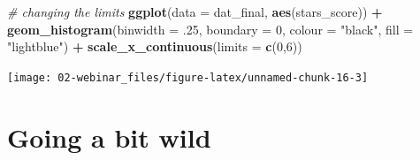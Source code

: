 \documentclass[
  oneside]{book}
\newenvironment{Shaded}{\begin{snugshade}}{\end{snugshade}}
\newcommand{\AttributeTok}[1]{\textcolor[rgb]{0.13,0.29,0.53}{#1}}
\newcommand{\CommentTok}[1]{\textcolor[rgb]{0.56,0.35,0.01}{\textit{#1}}}
\newcommand{\DecValTok}[1]{\textcolor[rgb]{0.00,0.00,0.81}{#1}}
\newcommand{\FunctionTok}[1]{\textcolor[rgb]{0.13,0.29,0.53}{\textbf{#1}}}
\newcommand{\NormalTok}[1]{#1}
\newcommand{\SpecialCharTok}[1]{\textcolor[rgb]{0.81,0.36,0.00}{\textbf{#1}}}
\newcommand{\StringTok}[1]{\textcolor[rgb]{0.31,0.60,0.02}{#1}}
\begin{document}
\begin{Shaded}
\begin{Highlighting}[]
\CommentTok{\# changing the limits}
\FunctionTok{ggplot}\NormalTok{(}\AttributeTok{data =}\NormalTok{ dat\_final, }\FunctionTok{aes}\NormalTok{(stars\_score)) }\SpecialCharTok{+}
  \FunctionTok{geom\_histogram}\NormalTok{(}\AttributeTok{binwidth =}\NormalTok{ .}\DecValTok{25}\NormalTok{, }
                 \AttributeTok{boundary =} \DecValTok{0}\NormalTok{, }
                 \AttributeTok{colour =} \StringTok{"black"}\NormalTok{,}
                 \AttributeTok{fill =} \StringTok{"lightblue"}\NormalTok{) }\SpecialCharTok{+}
  \FunctionTok{scale\_x\_continuous}\NormalTok{(}\AttributeTok{limits =} \FunctionTok{c}\NormalTok{(}\DecValTok{0}\NormalTok{,}\DecValTok{6}\NormalTok{))}
\end{Highlighting}
\end{Shaded}

\begin{center}\texttt{[image: 02-webinar\_files/figure-latex/unnamed-chunk-16-3]} \end{center}

\section{Going a bit wild}\label{going-a-bit-wild}
\end{document}
